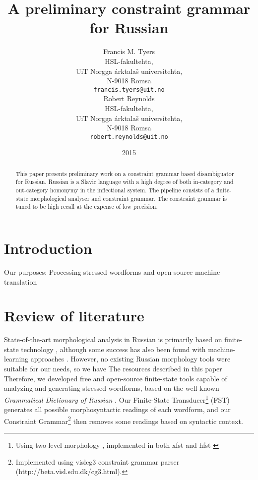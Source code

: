 \documentclass[11pt]{article}
\title{A preliminary constraint grammar for Russian}
\author{Francis M. Tyers \\
  HSL-fakultehta, \\
  UiT Norgga árktalaš universitehta, \\
  N-9018 Romsa \\
  {\tt francis.tyers@uit.no} \\\And
  Robert Reynolds \\
  HSL-fakultehta, \\
  UiT Norgga árktalaš universitehta, \\
  N-9018 Romsa \\
  {\tt robert.reynolds@uit.no} \\}
\date{2015}
\begin{document}
\maketitle
\begin{abstract}
 This paper presents preliminary work on a constraint
 grammar based disambiguator for Russian. Russian is
 a Slavic language with a high degree of both in-category
 and out-category homonymy in the inflectional system.
 The pipeline consists of a finite-state morphological
 analyser and constraint grammar. The constraint 
 grammar is tuned to be high recall at the expense of 
 low precision.
\end{abstract}

\section{Introduction}

Our purposes: Processing stressed wordforms and open-source machine translation

\cite{Karlsson-90}


\section{Review of literature}


State-of-the-art morphological analysis in Russian is primarily based on finite-
state technology \cite{Nozhov-03,Segalovich-03}, although some success has 
also been found with machine-learning approaches \cite{sharoff08lrec-mocky}. 
However, no existing Russian morphology tools were suitable for our needs, so
we have 
The resources described in this paper Therefore, we developed free and 
open-source finite-state 
tools capable of analyzing and generating stressed wordforms, based on the
well-known \emph{Grammatical Dictionary of Russian} \cite{Zaliznjak-77}.
Our Finite-State Transducer\footnote{Using two-level 
morphology \cite{Koskenniemi-84}, implemented in both xfst
\cite{Beesley.Karttunen-03} and hfst \cite{hfst-11}} (FST) generates all possible 
morphosyntactic readings of each wordform, and our Constraint 
Grammar\footnote{Implemented using vislcg3 constraint grammar parser
(http://beta.visl.sdu.dk/cg3.html).}
\cite{Karlsson-90,Karlsson.Voutilainen.ea-95} then removes
some readings based on syntactic context. 
\end{document}
